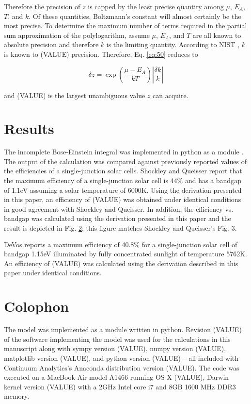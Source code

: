 \documentclass[letterpaper,12pt]{article}
\begin{document}
\noindent Therefore the precision of $z$ is capped by the least precise quantity among $\mu$, $E_{A}$, $T$, and $k$. Of these quantities, Boltzmann's constant will almost certainly be the most precise. To determine the maximum number of terms required in the partial sum approximation of the polylogarithm, assume $\mu$, $E_{A}$, and $T$ are all known to absolute precision and therefore $k$ is the limiting quantity. According to NIST \cite{}, $k$ is known to (VALUE) precision. Therefore, Eq. \ref{eq:50} reduces to

\begin{equation} \label{eq:51}
\delta z = \exp \left( \frac{\mu - E_{A}}{kT} \right) \left| \frac{\delta k}{k} \right|
\end{equation}

\noindent and (VALUE) is the largest unambiguous value $z$ can acquire.


\section{Results}
The incomplete Bose-Einstein integral was implemented in python as a module \cite{}. The output of the calculation was compared against previously reported values of the efficiencies of a single-junction solar cells. Shockley and Queisser \cite{10.1063/1.1736034} report that the maximum efficiency of a single-junction solar cell is 44\% and has a bandgap of 1.1eV assuming a solar temperature of 6000K. Using the derivation presented in this paper, an efficiency of (VALUE) was obtained under identical conditions in good agreement with Shockley and Queisser. In addition, the efficiency vs. bandgap was calculated using the derivation presented in this paper and the result is depicted in Fig. \ref{}; this figure matches Shockley and Queisser's Fig. 3.

DeVos \cite{9780198513926} reports a maximum efficiency of 40.8\% for a single-junction solar cell of bandgap 1.15eV illuminated by fully concentrated sunlight of temperature 5762K. An efficiency of (VALUE) was calculated using the derivation described in this paper under identical conditions.


\section{Colophon}
The model was implemented as a module written in python. Revision (VALUE) \cite{} of the software implementing the model was used for the calculations in this manuscript along with sympy version (VALUE), numpy version (VALUE), matplotlib version (VALUE), and python version (VALUE) -- all included with Continuum Analytics's Anaconda distribution version (VALUE).  The code was executed on a MacBook Air model A1466 running OS X (VALUE), Darwin kernel version (VALUE) with a 2GHz Intel core i7 and 8GB 1600 MHz DDR3 memory.
\end{document}
